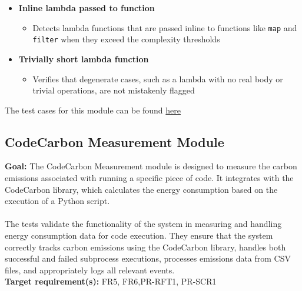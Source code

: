 \documentclass[12pt, titlepage]{article}
\begin{document}
\begin{itemize}
    \item \textbf{Inline lambda passed to function}
        \begin{itemize}
        \item Detects lambda functions that are passed inline to functions like \texttt{map} and \texttt{filter} when they exceed the complexity thresholds
        \end{itemize}

    \item \textbf{Trivially short lambda function}
        \begin{itemize}
        \item Verifies that degenerate cases, such as a lambda with no real body or trivial operations, are not mistakenly flagged
        \end{itemize}
\end{itemize}

  \noindent The test cases for this module can be found
  \href{https://github.com/ssm-lab/capstone--source-code-optimizer/blob/main/tests/analyzers/test_long_lambda_element.py}{here}

  \subsection{CodeCarbon Measurement Module}
  \textbf{Goal:} The CodeCarbon Measurement module is designed to
  measure the carbon emissions associated with running a specific
  piece of code. It integrates with the CodeCarbon library, which
  calculates the energy consumption based on the execution of a
  Python script.\\ \\
  \noindent The tests validate the functionality of the system in
  measuring and handling energy consumption data for code execution.
  They ensure that the system correctly tracks carbon emissions using
  the CodeCarbon library, handles both successful and failed
  subprocess executions, processes emissions data from CSV files, and
  appropriately logs all relevant events.\\

  \noindent \textbf{Target requirement(s):} FR5, FR6,PR-RFT1,
  PR-SCR1~\cite{SRS} \\
\end{document}
